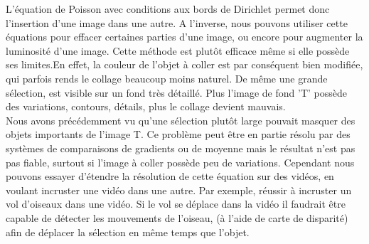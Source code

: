 L'équation de Poisson avec conditions aux bords de Dirichlet permet donc l'insertion d'une image dans une autre. A l'inverse, nous pouvons utiliser cette équations pour effacer certaines parties d'une image, ou encore pour augmenter la luminosité d'une image. Cette méthode est plutôt efficace même si elle possède ses limites.En effet, la couleur de l'objet à coller est par conséquent bien modifiée, qui parfois rends le collage beaucoup moins naturel. De même une grande sélection, est visible sur un fond très détaillé. Plus l'image de fond 'T' possède des variations, contours, détails, plus le collage devient mauvais. \\
Nous avons précédemment vu qu'une sélection plutôt large pouvait masquer des objets importants de l'image T. Ce problème peut être en partie résolu par des systèmes de comparaisons de gradients ou de moyenne mais le résultat n'est pas pas fiable, surtout si l'image à coller possède peu de variations. Cependant nous pouvons essayer d'étendre la résolution de cette équation sur des vidéos, en voulant incruster une vidéo dans une autre. Par exemple, réussir à incruster un vol d'oiseaux dans une vidéo. Si le vol se déplace dans la vidéo il faudrait être capable de détecter les mouvements de l'oiseau, (à l'aide de carte de disparité) afin de déplacer la sélection en même temps que l'objet.